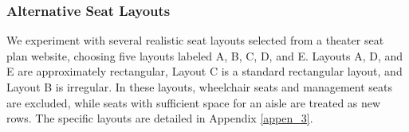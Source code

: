 






\subsubsection{Alternative Seat Layouts}
We experiment with several realistic seat layouts selected from a theater seat plan website, choosing five layouts labeled A, B, C, D, and E. Layouts A, D, and E are approximately rectangular, Layout C is a standard rectangular layout, and Layout B is irregular. In these layouts, wheelchair seats and management seats are excluded, while seats with sufficient space for an aisle are treated as new rows. The specific layouts are detailed in Appendix \ref{appen_3}.

